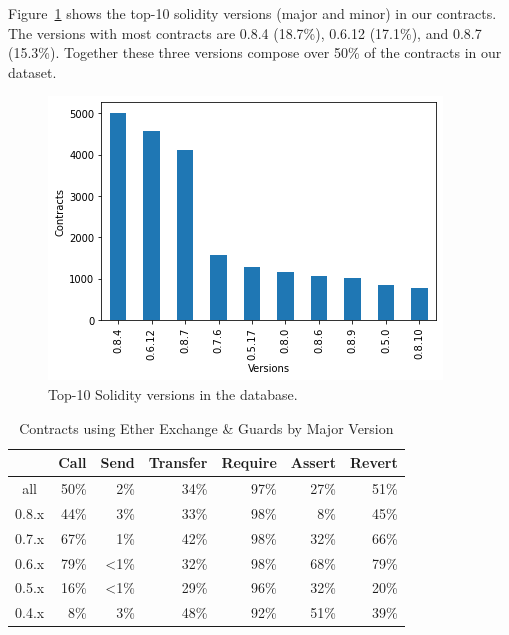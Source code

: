 \documentclass[10pt,conference]{IEEEtran}
\begin{document}
Figure~\ref{fig:minor-versions} shows the top-10 solidity versions (major and minor) in our contracts. The versions with most contracts are 0.8.4 (18.7\%), 0.6.12 (17.1\%), and 0.8.7 (15.3\%). Together these three versions compose over 50\% of the contracts in our dataset.

\begin{figure}[h]
  \centering
  \includegraphics[width=\linewidth]{./img/clean_versions_final.png}
  \caption{Top-10 Solidity versions in the database.}
  \label{fig:minor-versions}
\end{figure}

\begin{table}
\center
  \caption{Contracts using Ether Exchange \& Guards by Major Version}
  \label{tab:results-version}
  \begin{tabular}{crrrrrr}
    \hline
      & Call & Send & Transfer & Require & Assert & Revert \\
    \hline
    all & 50\% & 2\% & 34\% &  97\% & 27\% & 51\% \\
    0.8.x & 44\% & 3\% & 33\%  & 98\% & 8\% & 45\% \\
    0.7.x & 67\% & 1\% & 42\% & 98\% & 32\% & 66\% \\ 
    0.6.x & 79\% & <1\% & 32\% & 98\% & 68\% & 79\% \\
    0.5.x & 16\% & <1\% & 29\% & 96\% & 32\% & 20\% \\
    0.4.x & 8\% & 3\%  & 48\% & 92\% & 51\% & 39\% \\
    \hline
\end{tabular}
\end{table}
\end{document}
